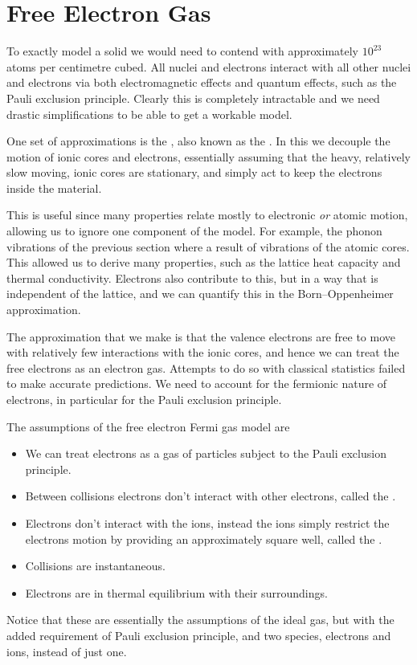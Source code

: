 \documentclass[fleqn]{NotesClass}
\begin{document}
    \chapter{Free Electron Gas}
    To exactly model a solid we would need to contend with approximately \(10^{23}\) atoms per centimetre cubed.
    All nuclei and electrons interact with all other nuclei and electrons via both electromagnetic effects and quantum effects, such as the Pauli exclusion principle.
    Clearly this is completely intractable and we need drastic simplifications to be able to get a workable model.
    
    One set of approximations is the , also known as the .
    In this we decouple the motion of ionic cores and electrons, essentially assuming that the heavy, relatively slow moving, ionic cores are stationary, and simply act to keep the electrons inside the material.
    
    This is useful since many properties relate mostly to electronic \emph{or} atomic motion, allowing us to ignore one component of the model.
    For example, the phonon vibrations of the previous section where a result of vibrations of the atomic cores.
    This allowed us to derive many properties, such as the lattice heat capacity and thermal conductivity.
    Electrons also contribute to this, but in a way that is independent of the lattice, and we can quantify this in the Born--Oppenheimer approximation.
    
    The approximation that we make is that the valence electrons are free to move with relatively few interactions with the ionic cores, and hence we can treat the free electrons as an electron gas.
    Attempts to do so with classical statistics failed to make accurate predictions.
    We need to account for the fermionic nature of electrons, in particular for the Pauli exclusion principle.
    
    The assumptions of the free electron Fermi gas model are
    \begin{itemize}
        \item We can treat electrons as a gas of particles subject to the Pauli exclusion principle.
        \item Between collisions electrons don't interact with other electrons, called the .
        \item Electrons don't interact with the ions, instead the ions simply restrict the electrons motion by providing an approximately square well, called the .
        \item Collisions are instantaneous.
        \item Electrons are in thermal equilibrium with their surroundings.
    \end{itemize}
    Notice that these are essentially the assumptions of the ideal gas, but with the added requirement of Pauli exclusion principle, and two species, electrons and ions, instead of just one.
    
\end{document}
